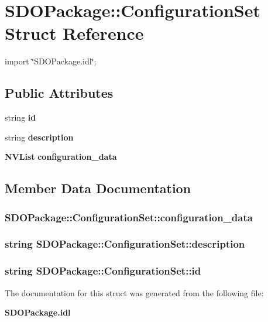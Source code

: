 \section{SDOPackage::ConfigurationSet Struct Reference}
\label{structSDOPackage_1_1ConfigurationSet}


{\ttfamily import \char`\"{}SDOPackage.idl\char`\"{};}

\subsection*{Public Attributes}
\begin{DoxyCompactItemize}
\item 
string {\bf id}
\item 
string {\bf description}
\item 
{\bf NVList} {\bf configuration\_\-data}
\end{DoxyCompactItemize}


\subsection{Member Data Documentation}
\subsubsection[{configuration\_\-data}]{ {\bf SDOPackage::ConfigurationSet::configuration\_\-data}}\label{structSDOPackage_1_1ConfigurationSet_ae28985bc93cdf23fc12357aa03552ebb}
\subsubsection[{description}]{\setlength{\rightskip}{0pt plus 5cm}string {\bf SDOPackage::ConfigurationSet::description}}\label{structSDOPackage_1_1ConfigurationSet_ab29b970de7ba627ab35ad294e92c7983}
\subsubsection[{id}]{\setlength{\rightskip}{0pt plus 5cm}string {\bf SDOPackage::ConfigurationSet::id}}\label{structSDOPackage_1_1ConfigurationSet_a2e6620e0ecf1dbbefb4d25ec3d0e6ca5}


The documentation for this struct was generated from the following file:\begin{DoxyCompactItemize}
\item 
{\bf SDOPackage.idl}\end{DoxyCompactItemize}
